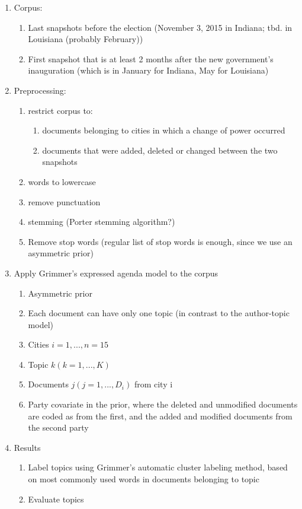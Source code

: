 \documentclass[11pt]{article}
\begin{document}
\begin{enumerate}
\item Corpus:
\begin{enumerate}
\item Last snapshots before the election (November 3, 2015 in Indiana; tbd. in Louisiana (probably February))
\item First snapshot that is at least 2 months after the new government's inauguration (which is in January for Indiana, May for Louisiana)
\end{enumerate}
\item Preprocessing:
\begin{enumerate}
\item restrict corpus to:
\begin{enumerate}
\item documents belonging to cities in which a change of power occurred
\item documents that were added, deleted or changed between the two snapshots
\end{enumerate}
\item words to lowercase
\item remove punctuation
\item stemming (Porter stemming algorithm?)
\item Remove stop words (regular list of stop words is enough, since we use an asymmetric prior)
\end{enumerate}
\item Apply Grimmer's expressed agenda model to the corpus
\begin{enumerate}
\item Asymmetric prior
\item Each document can have only one topic (in contrast to the author-topic model)
\item Cities $i = 1,..., n = 15$
\item Topic $k(k = 1,..., K )$
\item Documents $j(j = 1,...,D_i)$ from city i
\item Party covariate in the prior, where the deleted and unmodified documents are coded as from the first, and the added and modified documents from the second party
\end{enumerate}
\item Results
\begin{enumerate}
\item Label topics using Grimmer's automatic cluster labeling method, based on most commonly used words in documents belonging to topic
\item Evaluate topics
\end{enumerate}
\end{enumerate}
\end{document}
